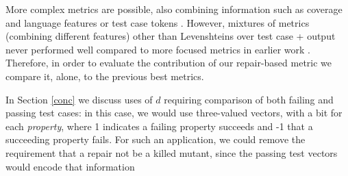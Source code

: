 More complex metrics are possible, also combining information such as
coverage and language features or test case tokens \cite{PLDI13}.
However, mixtures of metrics (combining different features) other than
Levenshteins \cite{lev} over test case + output never performed well
compared to more focused metrics in earlier work \cite{PLDI13}.
Therefore, in order to evaluate the contribution of our repair-based
metric we compare it, alone, to the previous best metrics.

In Section \ref{conc} we discuss uses of $d$
requiring comparison of both failing and passing test cases:  in this 
case, we would use three-valued vectors, with a bit for each \emph{property}, where 1 indicates a 
failing property succeeds and -1 that a succeeding property 
fails.  For such an application, we could remove the requirement that
a repair not be a killed mutant, since the passing test vectors would encode
that information